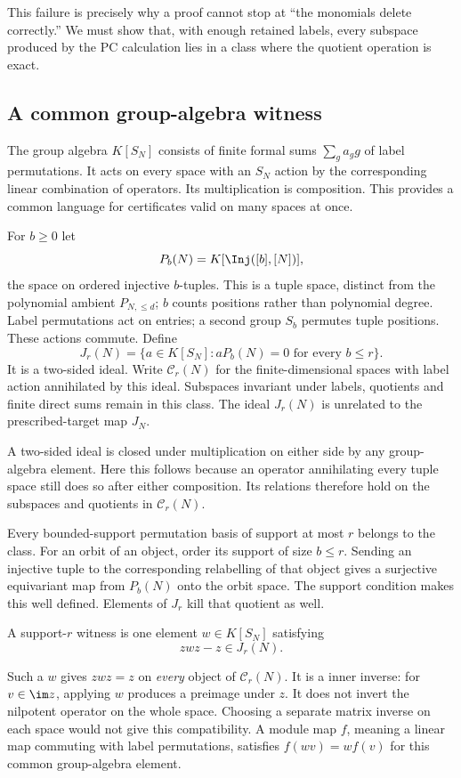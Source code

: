 This failure is precisely why a proof cannot stop at ``the monomials delete correctly.'' We must show that, with enough retained labels, every subspace produced by the PC calculation lies in a class where the quotient operation is exact.

\subsection{A common group-algebra witness}\label{sec:common}
The group algebra $K[S_N]$ consists of finite formal sums $\sum_ga_gg$ of label permutations. It acts on every space with an $S_N$ action by the corresponding linear combination of operators. Its multiplication is composition. This provides a common language for certificates valid on many spaces at once.

For $b\ge0$ let
\[P_b(N)=K[\Inj([b],[N])],\]
the space on ordered injective $b$-tuples. This is a tuple space, distinct from the polynomial ambient $P_{N,\le d}$; $b$ counts positions rather than polynomial degree. Label permutations act on entries; a second group $S_b$ permutes tuple positions. These actions commute. Define
\[J_r(N)=\{a\in K[S_N]:aP_b(N)=0\text{ for every }b\le r\}.\]
It is a two-sided ideal. Write $\mathcal C_r(N)$ for the finite-dimensional spaces with label action annihilated by this ideal. Subspaces invariant under labels, quotients and finite direct sums remain in this class.
The ideal $J_r(N)$ is unrelated to the prescribed-target map $J_N$.

A two-sided ideal is closed under multiplication on either side by
any group-algebra element. Here this follows because an operator
annihilating every tuple space still does so after either composition.
Its relations therefore hold on the subspaces and quotients in
$\mathcal C_r(N)$.

Every bounded-support permutation basis of support at most $r$ belongs to the class. For an orbit of an object, order its support of size $b\le r$. Sending an injective tuple to the corresponding relabelling of that object gives a surjective equivariant map from $P_b(N)$ onto the orbit space. The support condition makes this well defined. Elements of $J_r$ kill that quotient as well.

\begin{definition}
A support-$r$ witness is one element $w\in K[S_N]$ satisfying
\begin{equation}\label{eq:witness2}zwz-z\in J_r(N).
\end{equation}
\end{definition}
Such a $w$ gives $zwz=z$ on \emph{every} object of $\mathcal C_r(N)$. It is a inner inverse: for $v\in\im z$, applying $w$ produces a preimage under $z$. It does not invert the nilpotent operator on the whole space. Choosing a separate matrix inverse on each space would not give this compatibility. A module map $f$, meaning a linear map commuting with label permutations, satisfies $f(wv)=w f(v)$ for this common group-algebra element.

